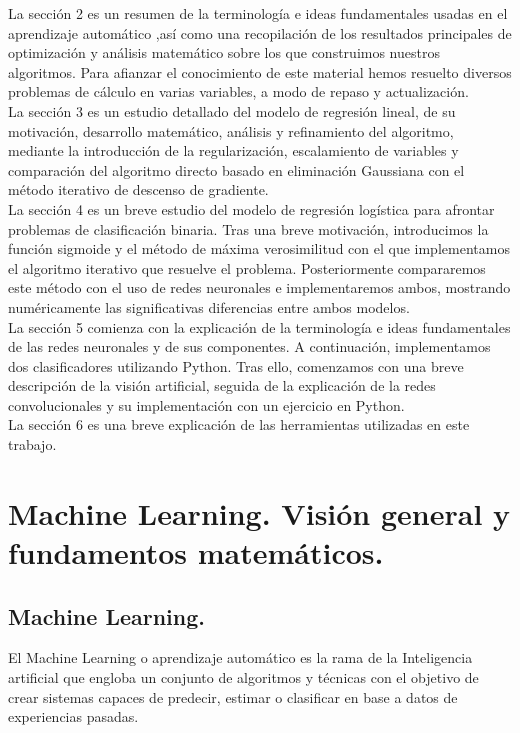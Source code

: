\documentclass[a4paper,11pt]{article}
\begin{document}
\noindent
La sección 2 es un resumen de la terminología e ideas fundamentales usadas en
el aprendizaje automático ,así como una recopilación de los resultados principales
de optimización y análisis matemático sobre los que construimos nuestros algoritmos. Para afianzar el conocimiento de este material hemos resuelto diversos
problemas de cálculo en varias variables, a modo de repaso y actualización.\\

\noindent
La sección 3 es un estudio detallado del modelo de regresión lineal, de su motivación, desarrollo matemático, análisis y refinamiento del algoritmo, mediante
la introducción de la regularización, escalamiento de variables y comparación del
algoritmo directo basado en eliminación Gaussiana con el método iterativo de
descenso de gradiente.\\

\noindent
La sección 4 es un breve estudio del modelo de regresión logística para afrontar
problemas de clasificación binaria. Tras una breve motivación, introducimos la
función sigmoide y el método de máxima verosimilitud con el que implementamos
el algoritmo iterativo que resuelve el problema. Posteriormente compararemos
este método con el uso de redes neuronales e implementaremos ambos, mostrando
numéricamente las significativas diferencias entre ambos modelos.\\

\noindent
La sección 5 comienza con la explicación de la terminología e ideas fundamentales de las redes neuronales y de sus componentes. A continuación, implementamos dos clasificadores utilizando Python. Tras ello, comenzamos con una breve descripción de la visión artificial, seguida de la explicación de la redes convolucionales y su implementación con un ejercicio en Python.\\

\noindent
La sección 6 es una breve explicación de las herramientas utilizadas en este trabajo.


\newpage
\section{Machine Learning. Visión general y fundamentos matemáticos.}

\subsection{Machine Learning.}
El Machine Learning o aprendizaje automático es la rama de la Inteligencia artificial que engloba un conjunto de algoritmos y técnicas con el objetivo de crear sistemas capaces de predecir, estimar o clasificar en base a datos de experiencias pasadas.\\
\end{document}
